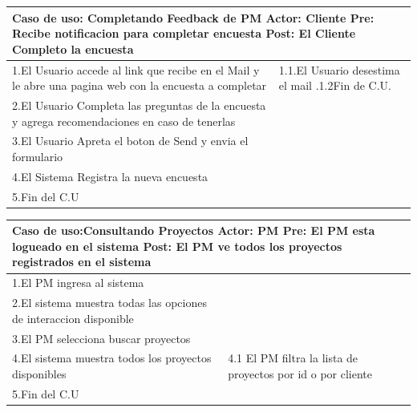 \begin{longtable}{|p{}|p{}|}
    \hline
    \multicolumn{2}{|p{16cm}|}{
        \textbf{Caso de uso:} Completando Feedback de PM\newline
        \textbf{Actor:} Cliente\newline
        \textbf{Pre: }Recibe notificacion para completar encuesta\newline
        \textbf{Post: }El Cliente Completo la encuesta
    }\\
    \hline
    1.El Usuario accede al link que recibe en el Mail y le abre una pagina web con la encuesta a completar & 1.1.El Usuario desestima el mail .\newline 1.2Fin de C.U.\\
    \hline
    2.El Usuario Completa las preguntas de la encuesta y agrega recomendaciones en caso de tenerlas&    \\
    \hline
    3.El Usuario Apreta el boton de Send y envia el formulario& \\
    \hline
    4.El Sistema Registra la nueva encuesta&\\
    \hline
    5.Fin del C.U&\\
    \hline
\end{longtable}

\begin{longtable}{|p{}|p{}|}
    \hline
    \multicolumn{2}{|p{16cm}|}{
        \textbf{Caso de uso:}Consultando Proyectos\newline
        \textbf{Actor:} PM\newline
        \textbf{Pre: }El PM esta logueado en el sistema\newline
        \textbf{Post:} El PM ve todos los proyectos registrados en el sistema
    }\\
    \hline
    1.El PM ingresa al sistema& \\
    \hline
    2.El sistema muestra todas las opciones de interaccion disponible&  \\
    \hline
    3.El PM selecciona buscar proyectos& \\
    \hline
    4.El sistema muestra todos los proyectos disponibles&4.1 El PM filtra la lista de proyectos por id o por cliente\\
    \hline
    5.Fin del C.U&\\
    \hline
\end{longtable}


